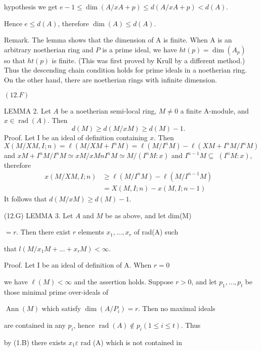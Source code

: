hypothesis we get $e-1 \leqslant \operatorname{dim}(A / x A+p) \leqslant d(A / x A+p)<d(A)$.

Hence $e \leqslant d(A)$, therefore $\operatorname{dim}(A) \leqslant d(A)$.

Remark. The lemma shows that the dimension of A is finite. When A is an arbitrary noetherian ring and $P$ is a prime ideal, we have $h t(p)=\operatorname{dim}\left(A_{p}\right)$ so that $h t(p)$ is finite. (This was first proved by Krull by a different method.) Thus the descending chain condition holds for prime ideals in a noetherian ring. On the other hand, there are noetherian rings with infinite dimension.

$(12 . F)$

LEMMA 2. Let $A$ be a noetherian semi-local ring, $M \neq 0$ a finite A-module, and $x \in \operatorname{rad}(A)$. Then
$$
d(M) \geqslant d(M / x M) \geqslant d(M)-1 .
$$
Proof. Let I be an ideal of definition containing $x$. Then $X(M / X M, I ; n)=\ell\left(M / X M+I^{n} M\right)=\ell\left(M / I^{n} M\right)-\ell\left(X M+I^{n} M / I^{n} M\right)$ and $x M+I^{n} M / I^{n} M \simeq x M / x M n I^{n} M \simeq M /\left(I^{n} M: x\right)$ and $I^{n-1} M \subseteq$ $\left(I^{n} M: x\right)$, therefore
$$
\begin{aligned}
x(M / X M, I ; n) & \geqslant \ell\left(M / I^{n} M\right)-\ell\left(M / I^{n-1} M\right) \\
&=X(M, I ; n)-x(M, I ; n-1)
\end{aligned}
$$
It follows that $d(M / x M) \geqslant d(M)-1$.

(12.G) LEMMA 3. Let $A$ and $M$ be as above, and let dim(M)

$=r$. Then there exist $r$ elements $x_{1}, \ldots, x_{r}$ of rad(A) such

that $l\left(M / x_{1} M+\ldots+x_{r} M\right)<\infty$.

Proof. Let I be an ideal of definition of A. When $r=0$

we have $\ell(M)<\infty$ and the assertion holds. Suppose $r>0$, and let $p_{1}, \ldots, p_{t}$ be those minimal prime over-ideals of

$\operatorname{Ann}(M)$ which satisfy $\operatorname{dim}\left(A / P_{i}\right)=r$. Then no maximal ideals

are contained in any $p_{i}$, hence $\operatorname{rad}(A) \notin p_{i}(1 \leqslant i \leqslant t)$. Thus

by (1.B) there exists $x_{1} \varepsilon$ rad (A) which is not contained in

